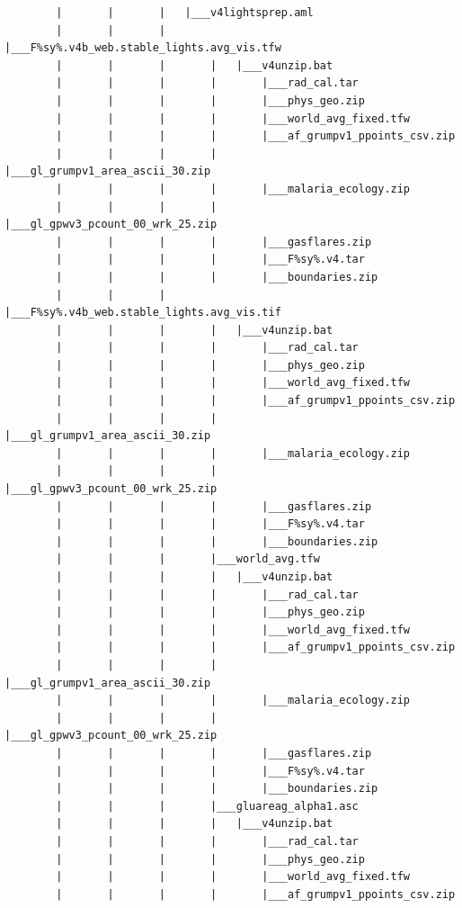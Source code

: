 \documentclass[]{book}
\begin{document}
\begin{verbatim}
        |       |       |   |___v4lightsprep.aml
        |       |       |       |___F%sy%.v4b_web.stable_lights.avg_vis.tfw
        |       |       |       |   |___v4unzip.bat
        |       |       |       |       |___rad_cal.tar
        |       |       |       |       |___phys_geo.zip
        |       |       |       |       |___world_avg_fixed.tfw
        |       |       |       |       |___af_grumpv1_ppoints_csv.zip
        |       |       |       |       |___gl_grumpv1_area_ascii_30.zip
        |       |       |       |       |___malaria_ecology.zip
        |       |       |       |       |___gl_gpwv3_pcount_00_wrk_25.zip
        |       |       |       |       |___gasflares.zip
        |       |       |       |       |___F%sy%.v4.tar
        |       |       |       |       |___boundaries.zip
        |       |       |       |___F%sy%.v4b_web.stable_lights.avg_vis.tif
        |       |       |       |   |___v4unzip.bat
        |       |       |       |       |___rad_cal.tar
        |       |       |       |       |___phys_geo.zip
        |       |       |       |       |___world_avg_fixed.tfw
        |       |       |       |       |___af_grumpv1_ppoints_csv.zip
        |       |       |       |       |___gl_grumpv1_area_ascii_30.zip
        |       |       |       |       |___malaria_ecology.zip
        |       |       |       |       |___gl_gpwv3_pcount_00_wrk_25.zip
        |       |       |       |       |___gasflares.zip
        |       |       |       |       |___F%sy%.v4.tar
        |       |       |       |       |___boundaries.zip
        |       |       |       |___world_avg.tfw
        |       |       |       |   |___v4unzip.bat
        |       |       |       |       |___rad_cal.tar
        |       |       |       |       |___phys_geo.zip
        |       |       |       |       |___world_avg_fixed.tfw
        |       |       |       |       |___af_grumpv1_ppoints_csv.zip
        |       |       |       |       |___gl_grumpv1_area_ascii_30.zip
        |       |       |       |       |___malaria_ecology.zip
        |       |       |       |       |___gl_gpwv3_pcount_00_wrk_25.zip
        |       |       |       |       |___gasflares.zip
        |       |       |       |       |___F%sy%.v4.tar
        |       |       |       |       |___boundaries.zip
        |       |       |       |___gluareag_alpha1.asc
        |       |       |       |   |___v4unzip.bat
        |       |       |       |       |___rad_cal.tar
        |       |       |       |       |___phys_geo.zip
        |       |       |       |       |___world_avg_fixed.tfw
        |       |       |       |       |___af_grumpv1_ppoints_csv.zip

\end{verbatim}
\end{document}
